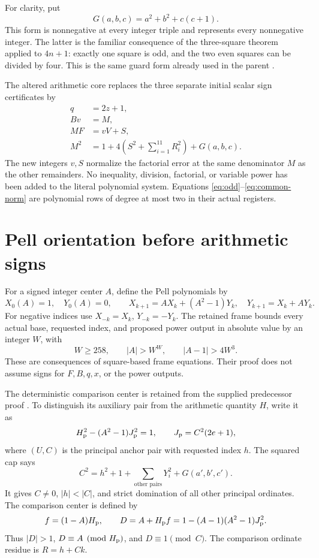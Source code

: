 For clarity, put
\[
 G(a,b,c)=a^2+b^2+c(c+1).
\]
This form is nonnegative at every integer triple and represents every
nonnegative integer. The latter is the familiar consequence of the
three-square theorem applied to \(4n+1\): exactly one square is odd, and
the two even squares can be divided by four. This is the same guard form
already used in the parent \cite{common}.

The altered arithmetic core replaces the three separate initial scalar
sign certificates by
\begin{align}
 q&=2z+1,                                                    \label{eq:odd}\\
 Bv&=M,                                                     \label{eq:factor-ratio}\\
 MF&=vV+S,                                                  \label{eq:factor-error}\\
 M^2&=1+4\left(S^2+\sum_{i=1}^{11}R_i^2\right)+G(a,b,c).
                                                               \label{eq:common-norm}
\end{align}
The new integers \(v,S\) normalize the factorial error at the same
denominator \(M\) as the other remainders. No inequality, division,
factorial, or variable power has been added to the literal polynomial
system. Equations \eqref{eq:odd}--\eqref{eq:common-norm} are polynomial
rows of degree at most two in their actual registers.

\section{Pell orientation before arithmetic signs}

For a signed integer center \(A\), define the Pell polynomials by
\[
 X_0(A)=1,\quad Y_0(A)=0,\qquad
 X_{k+1}=AX_k+(A^2-1)Y_k,\quad Y_{k+1}=X_k+AY_k.
\]
For negative indices use \(X_{-k}=X_k\), \(Y_{-k}=-Y_k\).
The retained frame bounds every actual base, requested index, and proposed
power output in absolute value by an integer \(W\), with
\begin{equation}\label{eq:frame}
 W\ge258,\qquad |A|>W^W,\qquad |A-1|>4W^3.
\end{equation}
These are consequences of square-based frame equations. Their proof does
not assume signs for \(F,B,q,x\), or the power outputs.

The deterministic comparison center is retained from the supplied
predecessor proof \cite{symmetric}. To distinguish its auxiliary pair
from the arithmetic quantity \(H\), write it as
\[
 H_{\rm p}^2-(A^2-1)J_{\rm p}^2=1,\qquad
 J_{\rm p}=C^2(2e+1),
\]
where \((U,C)\) is the principal anchor pair with requested index \(h\).
The squared cap says
\[
 C^2=h^2+1+\sum_{\text{other pairs}}Y_i^2+G(a',b',c').
\]
It gives \(C\ne0\), \(|h|<|C|\), and strict domination of all other
principal ordinates. The comparison center is defined by
\[
 f=(1-A)H_{\rm p},\qquad D=A+H_{\rm p}f
    =1-(A-1)(A^2-1)J_{\rm p}^2.
\]
Thus \(|D|>1\), \(D\equiv A\pmod{H_{\rm p}}\), and \(D\equiv1\pmod C\).
The comparison ordinate residue is \(R=h+Ck\).

